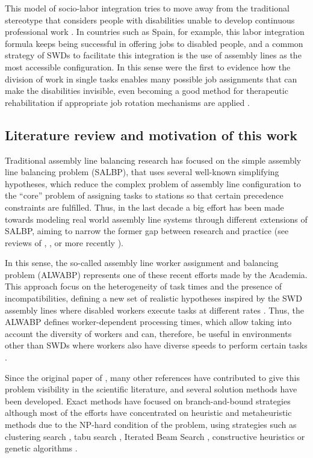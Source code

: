 \documentclass{singlecol-new}
\begin{document}
This model of socio-labor integration tries to move away from the traditional stereotype that considers people with disabilities unable to develop continuous professional work \citep{miralles10operations}. In countries such as Spain, for example, this labor integration formula keeps being successful in offering jobs to disabled people, and a common strategy of SWDs to facilitate this integration is the use of assembly lines as the most accessible configuration. In this sense \cite{miralles07advantages} were the first to evidence how the division of work in single tasks enables many possible job assignments that can make the disabilities invisible, even becoming a good method for therapeutic rehabilitation if appropriate job rotation mechanisms are applied \citep{costa09job}.

\subsection{Literature review and motivation of this work}

Traditional assembly line balancing research has focused on the simple assembly line balancing problem (SALBP), that uses several well-known simplifying hypotheses, which reduce the complex problem of assembly line configuration to the ``core'' problem of assigning tasks to stations so that certain precedence constraints are fulfilled. Thus, in the last decade a big effort has been made towards modeling real world assembly line systems through different extensions of SALBP, aiming to narrow the former gap between research and practice (see reviews of \cite{scholl06state}, \cite{becker06survey}, \cite{boysen07classification,boysen08assembly} or more recently \cite{dolgui13taxonomy}).

In this sense, the so-called assembly line worker assignment and balancing problem (ALWABP) represents one of these recent efforts made by the Academia. This approach focus on the heterogeneity of task times and the presence of incompatibilities, defining a new set of realistic hypotheses inspired by the SWD assembly lines where disabled workers execute tasks at different rates \citep{miralles07advantages}. Thus, the ALWABP defines worker-dependent processing times, which allow taking into account the diversity of workers and can, therefore, be useful in environments other than SWDs where workers also have diverse speeds to perform certain tasks \citep{araujo12two}.

Since the original paper of \cite{miralles07advantages}, many other references have contributed to give this problem visibility in the scientific literature, and several solution methods have been developed. Exact methods have focused on branch-and-bound strategies \citep{miralles08branch,borba14heuristic, vila14branch} although most of the efforts have concentrated on heuristic and metaheuristic methods due to the NP-hard condition of the problem, using strategies such as clustering search \citep{chaves09hybrid}, tabu search \citep{moreira09minimalist}, Iterated Beam Search \citep{blum11solving}, constructive heuristics \citep{moreira12simple} or genetic algorithms \citep{moreira12hybrid,mutlu13iterative}.
\end{document}
